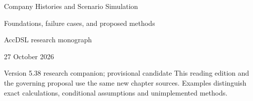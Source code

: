 \documentclass[11pt,a4paper]{report}
\begin{document}
\hypersetup{pageanchor=false}
\begin{titlepage}
{\Huge Company Histories and Scenario Simulation\par}
\vspace{12mm}
{\Large Foundations, failure cases, and proposed methods\par}
\vspace{8mm}
AccDSL research monograph\par 27 October 2026\par Version 5.38 research companion; provisional candidate
\vfill
This reading edition and the governing proposal use the same new chapter sources. Examples distinguish exact calculations, conditional assumptions and unimplemented methods.
\end{titlepage}
\hypersetup{pageanchor=true}
\tableofcontents
\clearpage{}


























\clearpage\label{sim:body-end}

\begingroup\raggedright
\endgroup
\end{document}
